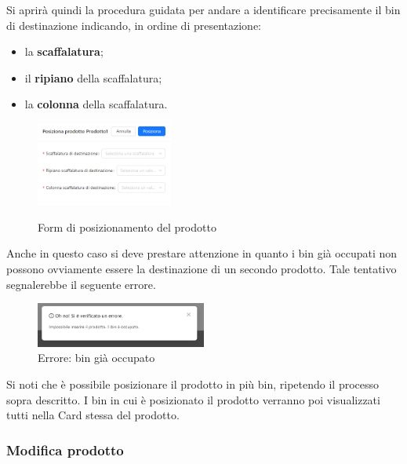         \noindent Si aprirà quindi la procedura guidata per andare a identificare precisamente il bin di destinazione indicando, in ordine di presentazione:
        \begin{itemize}
            \item la \textbf{scaffalatura};
            \item il \textbf{ripiano} della scaffalatura;
            \item la \textbf{colonna} della scaffalatura.
        \end{itemize}
        \begin{figure}[H]
            \centering
            \includegraphics[width=0.4\textwidth]{images/scelta_posizione_prodotto.png}
            \label{destinazione_prodotto}
            \caption{Form di posizionamento del prodotto}
        \end{figure}
        
        \noindent Anche in questo caso si deve prestare attenzione in quanto i bin già occupati non possono ovviamente essere la destinazione di un secondo prodotto. 
        Tale tentativo segnalerebbe il seguente errore.\\
        \begin{figure}[H]
            \centering
            \includegraphics[width=0.5\textwidth]{images/bin_occupato.png}
            \caption{Errore: bin già occupato}
        \end{figure}
        
        \noindent Si noti che è possibile posizionare il prodotto in più bin, ripetendo il processo sopra descritto. I bin in cui è posizionato il prodotto verranno poi visualizzati tutti nella Card stessa del prodotto. 
    \newpage

    \subsubsection{Modifica prodotto}\label{sec:prodotti:modifica}
